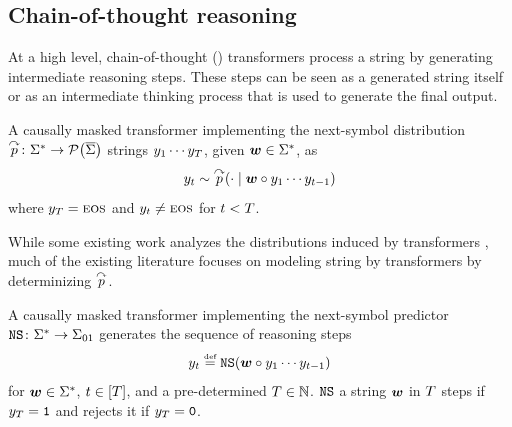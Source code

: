 \subsection{Chain-of-thought reasoning} \label{app:cot}

At a high level, chain-of-thought (\CoTAcr) transformers process a string by generating intermediate reasoning steps. 
These steps can be seen as a generated string itself or as an intermediate thinking process that is used to generate the final output.
\begin{definition}
   A causally masked transformer implementing the next-symbol distribution $\pLM \colon \strings \to \probOverFun{\eosalphabet}$  strings ${{y}}_1 \cdots {{y}}_{T}$, given ${{\boldsymbol{w}}} \in {{{{{{\Sigma}}^{*}}}}}$, as 
   \begin{equation}
      {{y}}_t \sim {\overset{\curvearrowright}{{{p}}}}(\cdot \mid {{\boldsymbol{w}}} \circ {{y}}_1 \cdots {{y}}_{t-1}) 
   \end{equation}
   where ${{y}}_{T} = {{\textsc{eos}}}$ and ${{y}}_t \neq {{\textsc{eos}}}$ for $t < {T}$.
\end{definition}

While some existing work analyzes the distributions induced by \CoTAcr transformers \citep{nowak-etal-2024-representational,xu2025cotloopformalcomparison}, much of the existing literature \citep{JMLR:v22:20-302,feng2023towards,merrill2024the,li2024chain,saunshi2025reasoninglatentthoughtspower} focuses on modeling string  by \CoTAcr transformers by determinizing ${\overset{\curvearrowright}{{{p}}}}$.
\begin{definition}
   A causally masked transformer implementing the next-symbol predictor ${{\texttt{NS}}}\colon {{{{{{\Sigma}}^{*}}}}} \to {{{\Sigma}}_{01}}$ generates the sequence of reasoning steps 
   \begin{equation}
      {{y}}_t \mathrel{\stackrel{\textnormal{\tiny def}}{=}} {{\texttt{NS}}}({{\boldsymbol{w}}} \circ {{y}}_1 \cdots {{y}}_{t-1}) 
   \end{equation}
   for ${{\boldsymbol{w}}} \in {{{{{{\Sigma}}^{*}}}}}$, $t \in {\left[ {T}\right]}$, and a pre-determined ${T} \in {{\mathbb{N}}}$.
   ${{\texttt{NS}}}$  a string ${{\boldsymbol{w}}}$ in ${T}$ steps if ${{y}}_{T} = {\texttt{1}}$ and rejects it if ${{y}}_{T} = {\texttt{0}}$.
\end{definition}

